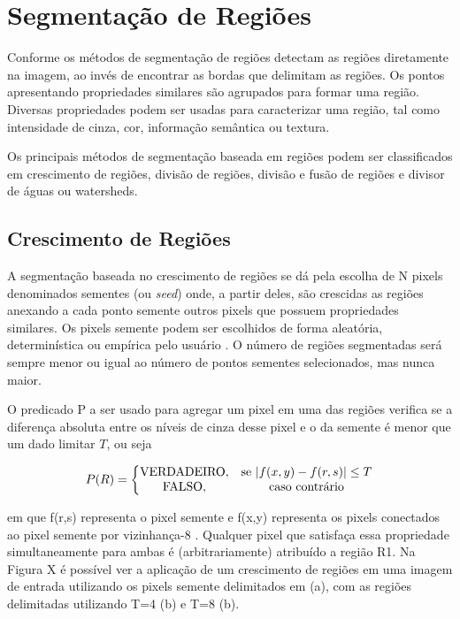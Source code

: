 \documentclass[12pt,oneside,a4paper,english,french,spanish,brazil,]{abntex2}
\begin{document}
\section{Segmentação de Regiões}
Conforme \cite{pedrini:2008} os métodos de segmentação de regiões detectam as regiões diretamente na imagem, ao invés de encontrar as bordas que delimitam as regiões. Os pontos apresentando propriedades similares são agrupados para formar uma região. Diversas propriedades podem ser usadas para caracterizar uma região, tal como intensidade de cinza, cor, informação semântica ou textura.

Os principais métodos de segmentação baseada em regiões podem ser classificados em crescimento de regiões, divisão de regiões, divisão e fusão de regiões e divisor de águas ou watersheds.

\subsection{Crescimento de Regiões}

A segmentação baseada no crescimento de regiões se dá pela escolha de N pixels denominados sementes (ou \textit{seed}) onde, a partir deles, são crescidas as regiões anexando a cada ponto semente outros pixels que possuem propriedades similares. Os pixels semente podem ser escolhidos de forma aleatória, determinística ou empírica pelo usuário \cite{pedrini:2008}. O número de regiões segmentadas será sempre menor ou igual ao número de pontos sementes selecionados, mas nunca maior.

O predicado P a ser usado para agregar um pixel em uma das regiões verifica se a diferença absoluta entre os níveis de cinza desse pixel e o da semente é menor que um dado limitar \(T\), ou seja

\[P(R) = \left\{\begin{matrix}
\textup{VERDADEIRO}, & \textup{se }|f(x,y) - f(r,s)| \leq T\\ 
\textup{FALSO}, & \textup{caso contrário}
\end{matrix}\right.\]

em que f(r,s) representa o pixel semente e f(x,y) representa os pixels conectados ao pixel semente por vizinhança-8 \cite{pedrini:2008}. Qualquer pixel que satisfaça essa propriedade simultaneamente para ambas é (arbitrariamente) atribuído a região R1. Na Figura X é possível ver a aplicação de um crescimento de regiões em uma imagem de entrada utilizando os pixels semente delimitados em (a), com as regiões delimitadas utilizando T=4 (b) e T=8 (b).
\end{document}

